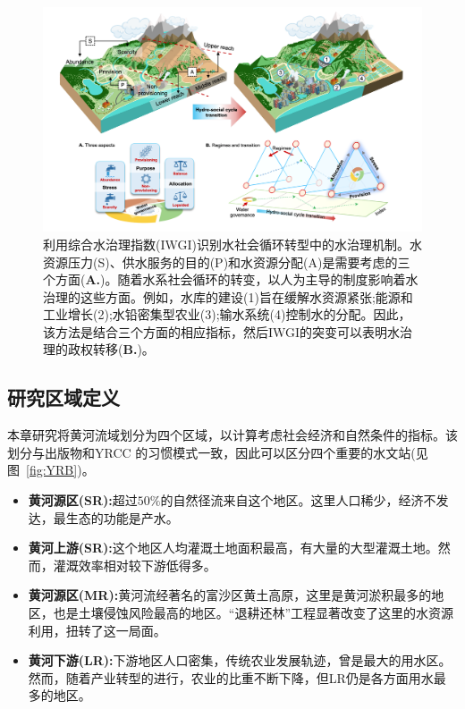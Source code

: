 \begin{figure}[!ht]
\centering
\includegraphics[width=\textwidth]{img/ch4/framework.png}
\caption[利用综合水治理指数(IWGI)识别水社会循环转型中的水治理机制]{
    利用综合水治理指数(IWGI)识别水社会循环转型中的水治理机制。水资源压力(S)、供水服务的目的(P)和水资源分配(A)是需要考虑的三个方面(\textbf{A.})。随着水系社会循环的转变，以人为主导的制度影响着水治理的这些方面。例如，水库的建设(1)旨在缓解水资源紧张;能源和工业增长(2);水铅密集型农业(3);输水系统(4)控制水的分配。因此，该方法是结合三个方面的相应指标，然后IWGI的突变可以表明水治理的政权转移(\textbf{B.})。
}
\label{ch4:fig:framework}
\end{figure}

\subsection{研究区域定义}
\label{ch4:sec:region}

本章研究将黄河流域划分为四个区域，以计算考虑社会经济和自然条件的指标。该划分与出版物和YRCC \cite{shuilibuhuangheshuiliweiyuanhui,wang2019c,wang2016e}的习惯模式一致，因此可以区分四个重要的水文站(见图~\ref{fig:YRB})。
\begin{itemize}
\item \textbf{黄河源区(SR):}超过$50\%$的自然径流来自这个地区。这里人口稀少，经济不发达，最生态的功能是产水。
\item \textbf{黄河上游(SR):}这个地区人均灌溉土地面积最高，有大量的大型灌溉土地。然而，灌溉效率相对较下游低得多。
\item \textbf{黄河源区(MR):}黄河流经著名的富沙区黄土高原，这里是黄河淤积最多的地区，也是土壤侵蚀风险最高的地区。“退耕还林”工程显著改变了这里的水资源利用，扭转了这一局面。
\item \textbf{黄河下游(LR):}下游地区人口密集，传统农业发展轨迹，曾是最大的用水区。然而，随着产业转型的进行，农业的比重不断下降，但LR仍是各方面用水最多的地区。
\end{itemize}

